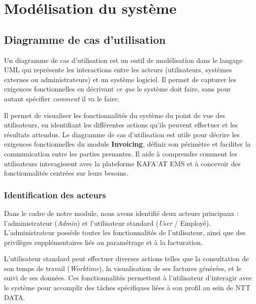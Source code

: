 \documentclass[12pt, a4paper, openany]{report}
\begin{document}
\vspace{-0.6cm}



\section{Modélisation du système}

\vspace{-0.7cm}
\subsection{Diagramme de cas d'utilisation}

\vspace{-0.4cm}
Un diagramme de cas d'utilisation est un outil de modélisation dans le langage UML qui représente les interactions entre les acteurs (utilisateurs, systèmes externes ou administrateurs) et un système logiciel. Il permet de capturer les exigences fonctionnelles en décrivant \textit{ce que} le système doit faire, sans pour autant spécifier \textit{comment} il va le faire.

Il permet de visualiser les fonctionnalités du système du point de vue des utilisateurs, en identifiant les différentes actions qu'ils peuvent effectuer et les résultats attendus. Le diagramme de cas d'utilisation est utile pour décrire les exigences fonctionnelles du module \textbf{Invoicing}, définir son périmètre et faciliter la communication entre les parties prenantes. Il aide à comprendre comment les utilisateurs interagissent avec la plateforme KAFA'AT EMS et à concevoir des fonctionnalités centrées sur leurs besoins. \cite{uml_ibm}

\vspace{-0.5cm}
\subsubsection{Identification des acteurs}

\vspace{-0.4cm}
Dans le cadre de notre module, nous avons identifié deux acteurs principaux : l'administrateur (\textit{Admin}) et l'utilisateur standard (\textit{User} / Employé). L'administrateur possède toutes les fonctionnalités de l'utilisateur, ainsi que des privilèges supplémentaires liés au paramétrage et à la facturation.

L'utilisateur standard peut effectuer diverses actions telles que la consultation de son temps de travail (\textit{Worktime}), la visualisation de ses factures générées, et le suivi de ses données. Ces fonctionnalités permettent à l'utilisateur d'interagir avec le système pour accomplir des tâches spécifiques liées à son profil au sein de NTT DATA.
\end{document}
